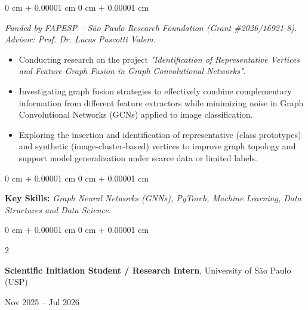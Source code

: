 \documentclass[10pt, letterpaper]{article}
\newenvironment{highlights}{
    \begin{itemize}[
        topsep=0.10 cm,
        parsep=0.10 cm,
        partopsep=0pt,
        itemsep=0pt,
        leftmargin=0 cm + 10pt
    ]
}{
    \end{itemize}
} %
\newenvironment{onecolentry}{
    \begin{adjustwidth}{
        0 cm + 0.00001 cm
    }{
        0 cm + 0.00001 cm
    }
}{
    \end{adjustwidth}
} %
\newenvironment{twocolentry}[2][]{
    \onecolentry
    \def\secondColumn{#2}
    \setcolumnwidth{\fill, 4.5 cm}
    \begin{paracol}{2}
}{
    \switchcolumn \raggedleft \secondColumn
    \end{paracol}
    \endonecolentry
} %
\begin{document}
\vspace{0.10 cm}
\begin{onecolentry}
    \textit{Funded by FAPESP -- São Paulo Research Foundation (Grant \#2026/16921-8). Advisor: Prof. Dr. Lucas Pascotti Valem.}
\begin{highlights}
        \item Conducting research on the project \textit{"Identification of Representative Vertices and Feature Graph Fusion in Graph Convolutional Networks"}.
        \item Investigating graph fusion strategies to effectively combine complementary information from different feature extractors while minimizing noise in Graph Convolutional Networks (GCNs) applied to image classification.
        \item Exploring the insertion and identification of representative (class prototypes) and synthetic (image-cluster-based) vertices to improve graph topology and support model generalization under scarce data or limited labels.
    \end{highlights}
\end{onecolentry}
\vspace{0.10 cm}
\begin{onecolentry}
    \setlength{\leftskip}{0.3cm}
    {\footnotesize \textbf{Key Skills:} \textit{Graph Neural Networks (GNNs), PyTorch, Machine Learning, Data Structures and Data Science.}}
\end{onecolentry}

\vspace{0.15cm}

\begin{twocolentry}{
    Nov 2025 – Jul 2026
}
    \textbf{Scientific Initiation Student / Research Intern}, University of São Paulo (USP)
\end{twocolentry}
\end{document}
